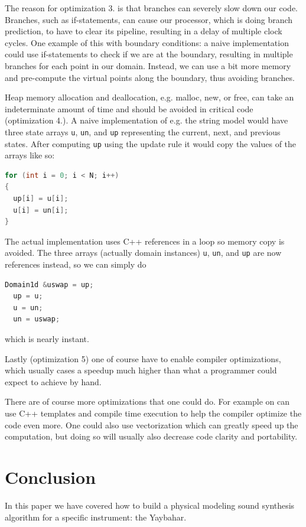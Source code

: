 \documentclass{article}
\begin{document}
The reason for optimization 3. is that branches can severely slow down our code.
Branches, such as if-statements, can cause our processor, which is doing branch prediction, to have to clear its pipeline, resulting in a delay of multiple clock cycles.
One example of this with boundary conditions: a naive implementation could use if-statements to check if we are at the boundary, resulting in multiple branches for each point in our domain.
Instead, we can use a bit more memory and pre-compute the virtual points along the boundary, thus avoiding branches.

Heap memory allocation and deallocation, e.g. malloc, new, or free, can take an indeterminate amount of time and should be avoided in critical code (optimization 4.).
A naive implementation of e.g. the string model would have three state arrays \lstinline{u}, \lstinline{un}, and \lstinline{up} representing the current, next, and previous states. After computing \lstinline{up} using the update rule it would copy the values of the arrays like so:
\begin{lstlisting}[language=C++]
for (int i = 0; i < N; i++)
{
  up[i] = u[i];
  u[i] = un[i];
}
\end{lstlisting}
The actual implementation uses C++ references in a loop so memory copy is avoided.
The three arrays (actually domain instances) \lstinline{u}, \lstinline{un}, and \lstinline{up} are now references instead, so we can simply do
\begin{lstlisting}[language=C++]
  Domain1d &uswap = up;
  up = u;
  u = un;
  un = uswap;
\end{lstlisting}
which is nearly instant.

Lastly (optimization 5) one of course have to enable compiler optimizations, which usually cases a speedup much higher than what a programmer could expect to achieve by hand.

There are of course more optimizations that one could do.
For example on can use C++ templates and compile time execution to help the compiler optimize the code even more.
One could also use vectorization which can greatly speed up the computation, but doing so will usually also decrease code clarity and portability. 

\section{Conclusion}
\label{sec:conclusion}

In this paper we have covered how to build a physical modeling sound synthesis algorithm for a specific instrument: the Yaybahar.
\end{document}
